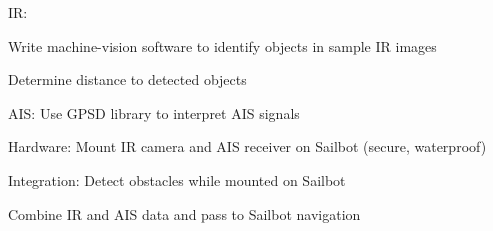 IR:

Write machine-vision software to identify objects in sample IR images

Determine distance to detected objects



AIS:
Use GPSD library to interpret AIS signals


Hardware:
Mount IR camera and AIS receiver on Sailbot (secure, waterproof)


Integration:
Detect obstacles while mounted on Sailbot

Combine IR and AIS data and pass to Sailbot navigation